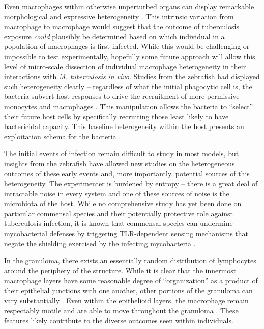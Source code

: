Even macrophages within otherwise unperturbed organs can display remarkable morphological and expressive heterogeneity \citep{Gordon2017, Gordon2005a}. This intrinsic variation from macrophage to macrophage would suggest that the outcome of tuberculosis exposure \textit{could} plausibly be determined based on which individual in a population of macrophages is first infected. While this would be challenging or impossible to test experimentally, hopefully some future approach will allow this level of micro\hyp{}scale dissection of individual macrophage heterogeneity in their interactions with \textit{M. tuberculosis} \textit{in vivo}. Studies from the zebrafish had displayed such heterogeneity clearly -- regardless of what the initial phagocytic cell is, the bacteria subvert host responses to drive the recruitment of more permissive monocytes and macrophages \citep{Cambier2014b}. This manipulation allows the bacteria to ``select'' their future host cells by specifically recruiting those least likely to have bactericidal capacity. This baseline heterogeneity within the host presents an exploitation schema for the bacteria \citep{Ramakrishnan2013b}.

The initial events of infection remain difficult to study in most models, but insights from the zebrafish have allowed new studies on the heterogeneous outcomes of these early events and, more importantly, potential sources of this heterogeneity. The experimenter is burdened by entropy -- there is a great deal of intractable noise in every system and one of these sources of noise is the microbiota of the host. While no comprehensive study has yet been done on particular commensal species and their potentially protective role against tuberculosis infection, it is known that commensal species can undermine mycobacterial defenses by triggering TLR\hyp{}dependent sensing mechanisms that negate the shielding exercised by the infecting mycobacteria \citep{Ramakrishnan2013b}.

In the granuloma, there exists an essentially random \citep{Orme2014a} distribution of lymphocytes around the periphery of the structure. While it is clear that the innermost macrophage layers have some reasonable degree of ``organization'' as a product of their epithelial junctions with one another, other portions of the granuloma can vary substantially \citep{Cronan2016}. Even within the epithelioid layers, the macrophage remain respectably motile and are able to move throughout the granuloma \citep{Cronan2018}. These features likely contribute to the diverse outcomes seen within individuals.

